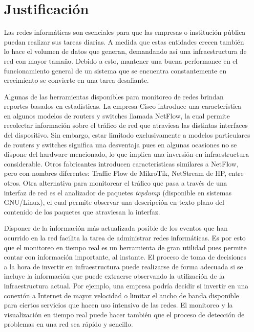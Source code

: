 \section*{Justificación}
Las redes informáticas son esenciales para que las empresas o institución pública puedan realizar sus tareas diarias. A medida que estas entidades crecen también lo hace el volumen de datos que generan, demandando así una infraestructura de red con mayor tamaño. Debido a esto, mantener una buena performance en el funcionamiento general de un sistema que se encuentra constantemente en crecimiento se convierte en una tarea desafiante.

Algunas de las herramientas disponibles para monitoreo de redes brindan reportes basados en estadísticas. La empresa Cisco\textsuperscript{\textregistered} introduce una característica en algunos modelos de routers y switches llamada NetFlow, la cual permite recolectar información sobre el tráfico de red que atraviesa las distintas interfaces del dispositivo. Sin embargo, estar limitado exclusivamente a modelos particulares de routers y switches significa una desventaja pues en algunas ocasiones no se dispone del hardware mencionado, lo que implica una inversión en infraestructura considerable. Otros fabricantes introducen características similares a NetFlow, pero con nombres diferentes: Traffic Flow de MikroTik, NetStream de HP, entre otros.
Otra alternativa para monitorear el tráfico que pasa a través de una interfaz de red es el analizador de paquetes \textit{tcpdump} (disponible en sistemas GNU/Linux), el cual permite observar una descripción en texto plano del contenido de los paquetes que atraviesan la interfaz.

Disponer de la información más actualizada posible de los eventos que han ocurrido en la red facilita la tarea de administrar redes informáticas. Es por esto que el monitoreo en tiempo real es un herramienta de gran utilidad pues permite contar con información importante, al instante. El proceso de toma de decisiones a la hora de invertir en infraestructura puede realizarse de forma adecuada si se incluye la información que puede extraerse observando la utilización de la infraestructura actual. Por ejemplo, una empresa podría decidir si invertir en una conexión a Internet de mayor velocidad o limitar el ancho de banda disponible para ciertos servicios que hacen uso intensivo de las redes. El monitoreo y la visualización en tiempo real puede hacer también que el proceso de detección de problemas en una red sea rápido y sencillo.

